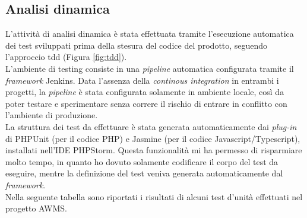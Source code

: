 \subsection{Analisi dinamica}
L'attività di analisi dinamica è stata effettuata tramite l'esecuzione automatica dei test sviluppati prima della stesura del codice del prodotto, seguendo l'approccio \acrshort{tdd} (Figura \ref{fig:tdd}).\\
L'ambiente di testing consiste in una \textit{pipeline} automatica configurata tramite il \textit{\gls{framework}} Jenkins. Data l'assenza della \textit{continous integration} in entrambi i progetti, la \textit{pipeline} è stata configurata solamente in ambiente locale, così da poter testare e sperimentare senza correre il rischio di entrare in conflitto con l'ambiente di produzione.\\
La struttura dei test da effettuare è stata generata automaticamente dai \textit{plug-in} di PHPUnit (per il codice PHP) e Jasmine (per il codice Javascript/Typescript), installati nell'IDE PHPStorm. Questa funzionalità mi ha permesso di risparmiare molto tempo, in quanto ho dovuto solamente codificare il corpo del test da eseguire, mentre la definizione del test veniva generata automaticamente dal \textit{\gls{framework}}.\\
Nella seguente tabella sono riportati i risultati di alcuni test d'unità effettuati nel progetto AWMS. 

